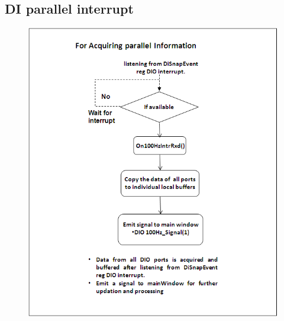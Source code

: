 \subsection{DI parallel interrupt}
\begin{figure}[H]
	\centering
	\includegraphics[width=\linewidth]{./FlowCharts/PngFlowCharts/SG4_DIO.png}
\end{figure}